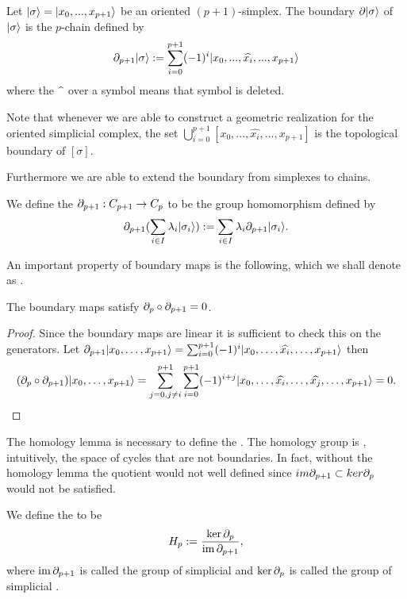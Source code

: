 \documentclass[../1.tex]{subfiles}
\begin{document}
    \begin{defn}
        Let $| \sigma \rangle = | x_0,...,x_{p+1} \rangle$ be an oriented $(p+1)$-simplex. The boundary $\partial| \sigma \rangle$ of $| \sigma \rangle$ is the $p$-chain
        defined by \[ \partial_{p+1}| \sigma \rangle := \sum_{i = 0}^{p+1}(-1)^i| x_0,...,\widehat{x_i},...,x_{p+1} \rangle\]
        where the  $\widehat{\color{white} a}$  over a symbol means that symbol is deleted.
    \end{defn}

    \begin{rem}
        Note that whenever we are able to construct a geometric realization for the oriented simplicial complex, the set $\bigcup_{i = 0}^{p+1}[x_0,...,\widehat{x_i},...,x_{p+1}]$
        is the topological boundary of $[\sigma]$.
    \end{rem}

    Furthermore we are able to extend the boundary from simplexes to chains.
    
    \begin{defn}
        We define the  $\partial_{p+1} : C_{p+1} \to C_p$ to be the group homomorphism defined by
        \[ \partial_{p+1}(\sum_{i \in I}\lambda_i| \sigma_i \rangle) := \sum_{i \in I}\lambda_i\partial_{p+1}| \sigma_i \rangle .\]
    \end{defn}

    An important property of boundary maps is the following, which we shall denote as .

    \begin{lem}
        The boundary maps satisfy $\partial_p \circ \partial_{p+1} = 0$.
    \end{lem}
    \begin{proof}
        Since the boundary maps are linear it is sufficient to check this on the generators.
        Let $\partial_{p+1}| x_0,\dots,x_{p+1} \rangle = \sum_{i=0}^{p+1} (-1)^i| x_0,\dots,\widehat{x_i},\dots,x_{p+1} \rangle$ then 
        \[(\partial_p \circ \partial_{p+1})| x_0,\dots,x_{p+1} \rangle = \sum_{j=0, j \neq i}^{p+1} \sum_{i=0}^{p+1} (-1)^{i+j}| x_0,\dots,\widehat{x_i},\dots,\widehat{x_j},\dots,x_{p+1} \rangle = 0. \qedhere \]     
    \end{proof}

    The homology lemma is necessary to define the .
    The homology group is , intuitively,  the space of cycles that are not boundaries. In fact, without the
    homology lemma the quotient would not well defined since $im\partial_{p+1} \subset ker\partial_p$ would not be satisfied.

    \begin{defn}
        We define the  to be 
        \[H_p := \frac{\ker\partial_p}{\mathrm{im}\,\partial_{p+1}},\] 
        where $\mathrm{im}\,\partial_{p+1}$ is called the group of simplicial  and
        $\ker\partial_p$ is called the group of simplicial .
    \end{defn}
\end{document}

